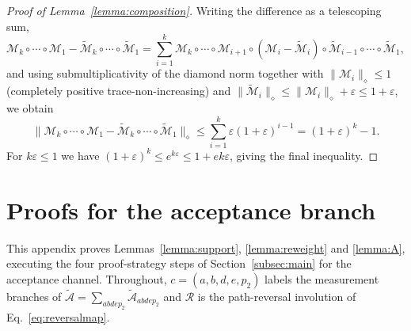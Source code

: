 \documentclass[aps,floatfix,10pt,amssymb,amsfont,amsmath,superscriptaddress,float,nofootinbib,longbibliography,nobalancelastpage,twocolumn]{revtex4-2}
\begin{document}
\begin{proof}[Proof of Lemma~\ref{lemma:composition}]
Writing the difference as a telescoping sum,
\begin{equation}
    \mathcal{M}_k \circ \cdots \circ \mathcal{M}_1 - \tilde{\mathcal{M}}_k \circ \cdots \circ \tilde{\mathcal{M}}_1 = \sum_{i=1}^{k} \mathcal{M}_k \circ \cdots \circ \mathcal{M}_{i+1} \circ (\mathcal{M}_i - \tilde{\mathcal{M}}_i) \circ \tilde{\mathcal{M}}_{i-1} \circ \cdots \circ \tilde{\mathcal{M}}_1,
\end{equation}
and using submultiplicativity of the diamond norm together with $\|\mathcal{M}_i\|_{\diamond} \leq 1$ (completely positive trace-non-increasing) and $\|\tilde{\mathcal{M}}_i\|_{\diamond} \leq \|\mathcal{M}_i\|_{\diamond} + \varepsilon \leq 1 + \varepsilon$, we obtain
\begin{equation}
    \|\mathcal{M}_k \circ \cdots \circ \mathcal{M}_1 - \tilde{\mathcal{M}}_k \circ \cdots \circ \tilde{\mathcal{M}}_1\|_{\diamond} \leq \sum_{i=1}^{k}\varepsilon(1+\varepsilon)^{i-1} = (1+\varepsilon)^k - 1.
\end{equation}
For $k\varepsilon \leq 1$ we have $(1+\varepsilon)^k \leq e^{k\varepsilon} \leq 1 + e k\varepsilon$, giving the final inequality.
\end{proof}
\section{Proofs for the acceptance branch}
\label{app:acceptproof}
This appendix proves Lemmas~\ref{lemma:support}, \ref{lemma:reweight} and \ref{lemma:A}, executing the four proof-strategy steps of Section~\ref{subsec:main} for the acceptance channel. Throughout, $c = (a,b,d,e,p_2)$ labels the measurement branches of $\tilde{\mathcal{A}} = \sum_{abdep_2}\tilde{\mathcal{A}}_{abdep_2}$ and $\mathcal{R}$ is the path-reversal involution of Eq.~\eqref{eq:reversalmap}.
\end{document}
